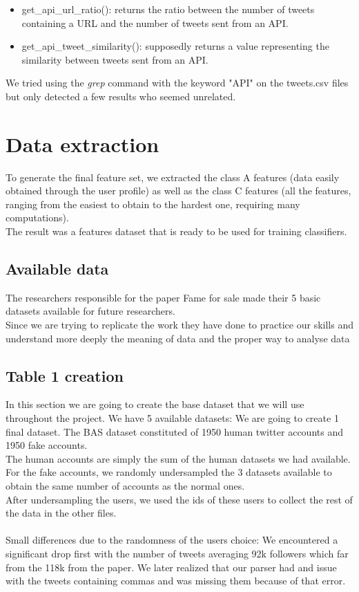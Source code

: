 \documentclass[a4paper,11pt]{article}
\begin{document}
\begin{itemize}
\item get_api_url_ratio(): returns the ratio between the number of tweets containing a URL and the number of tweets sent from an API.
\item get_api_tweet_similarity(): supposedly returns a value representing the similarity between tweets sent from an API.
\end{itemize} 

We tried using the \textit{grep} command with the keyword "API" on the tweets.csv files but only detected a few results who seemed unrelated.

\section{Data extraction}
To generate the final feature set, we extracted the class A features (data easily obtained through the user profile) as well as the class C features (all the features, ranging from the easiest to obtain to the hardest one, requiring many computations).\\

The result was a features dataset that is ready to be used for training classifiers.

\subsection{Available data}
The researchers responsible for the paper Fame for sale made their 5 basic datasets available for future researchers.\\ 

Since we are trying to replicate the work they have done to practice our skills and understand more deeply the meaning of data and the proper way to analyse data

\subsection{Table 1 creation}
In this section we are going to create the base dataset that we will use throughout the project.
We have 5 available datasets: 
We are going to create 1 final dataset. The BAS dataset constituted of 1950 human twitter accounts and 1950 fake accounts.\\ The human accounts are simply the sum of the human datasets we had available.\\
For the fake accounts, we randomly undersampled the 3 datasets available to obtain the same number of accounts as the normal ones.\\
After undersampling the users, we used the ids of these users to collect the rest of the data in the other files.\\\\
Small differences due to the randomness of the users choice:
We encountered a significant drop first with the number of tweets averaging 92k followers which far from the 118k from the paper. We later realized that our parser had and issue with the tweets containing commas and was missing them because of that error.\\
\end{document}
